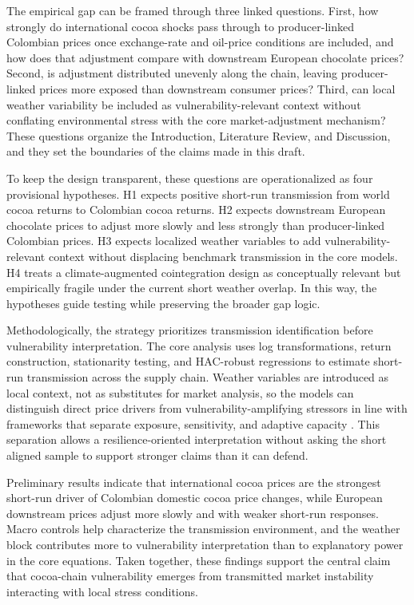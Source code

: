 \documentclass[11pt]{article}
\begin{document}
The empirical gap can be framed through three linked questions. First, how strongly do international cocoa shocks pass through to producer-linked Colombian prices once exchange-rate and oil-price conditions are included, and how does that adjustment compare with downstream European chocolate prices? Second, is adjustment distributed unevenly along the chain, leaving producer-linked prices more exposed than downstream consumer prices? Third, can local weather variability be included as vulnerability-relevant context without conflating environmental stress with the core market-adjustment mechanism? These questions organize the Introduction, Literature Review, and Discussion, and they set the boundaries of the claims made in this draft.

To keep the design transparent, these questions are operationalized as four provisional hypotheses. H1 expects positive short-run transmission from world cocoa returns to Colombian cocoa returns. H2 expects downstream European chocolate prices to adjust more slowly and less strongly than producer-linked Colombian prices. H3 expects localized weather variables to add vulnerability-relevant context without displacing benchmark transmission in the core models. H4 treats a climate-augmented cointegration design as conceptually relevant but empirically fragile under the current short weather overlap. In this way, the hypotheses guide testing while preserving the broader gap logic.

Methodologically, the strategy prioritizes transmission identification before vulnerability interpretation. The core analysis uses log transformations, return construction, stationarity testing, and HAC-robust regressions to estimate short-run transmission across the supply chain. Weather variables are introduced as local context, not as substitutes for market analysis, so the models can distinguish direct price drivers from vulnerability-amplifying stressors in line with frameworks that separate exposure, sensitivity, and adaptive capacity \citep{Turner2003,Jones2016}. This separation allows a resilience-oriented interpretation without asking the short aligned sample to support stronger claims than it can defend.

Preliminary results indicate that international cocoa prices are the strongest short-run driver of Colombian domestic cocoa price changes, while European downstream prices adjust more slowly and with weaker short-run responses. Macro controls help characterize the transmission environment, and the weather block contributes more to vulnerability interpretation than to explanatory power in the core equations. Taken together, these findings support the central claim that cocoa-chain vulnerability emerges from transmitted market instability interacting with local stress conditions.
\end{document}
